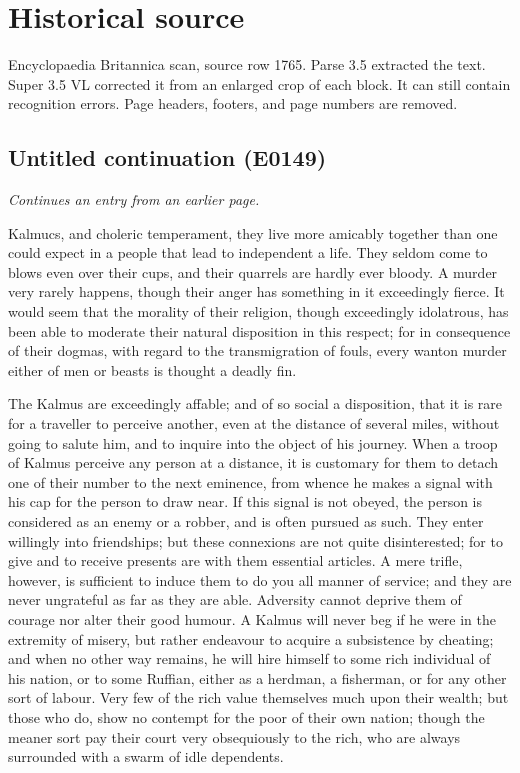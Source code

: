 \documentclass{article}
\begin{document}
\section*{Historical source}
Encyclopaedia Britannica scan, source row 1765. Parse 3.5 extracted the text. Super 3.5 VL corrected it from an enlarged crop of each block. It can still contain recognition errors.
Page headers, footers, and page numbers are removed.

\subsection*{Untitled continuation (E0149)}
\textit{Continues an entry from an earlier page.}

Kalmucs, and choleric temperament, they live more amicably together than one could expect in a people that lead to independent a life. They seldom come to blows even over their cups, and their quarrels are hardly ever bloody. A murder very rarely happens, though their anger has something in it exceedingly fierce. It would seem that the morality of their religion, though exceedingly idolatrous, has been able to moderate their natural disposition in this respect; for in consequence of their dogmas, with regard to the transmigration of fouls, every wanton murder either of men or beasts is thought a deadly fin.

The Kalmus are exceedingly affable; and of so social a disposition, that it is rare for a traveller to perceive another, even at the distance of several miles, without going to salute him, and to inquire into the object of his journey. When a troop of Kalmus perceive any person at a distance, it is customary for them to detach one of their number to the next eminence, from whence he makes a signal with his cap for the person to draw near. If this signal is not obeyed, the person is considered as an enemy or a robber, and is often pursued as such. They enter willingly into friendships; but these connexions are not quite disinterested; for to give and to receive presents are with them essential articles. A mere trifle, however, is sufficient to induce them to do you all manner of service; and they are never ungrateful as far as they are able. Adversity cannot deprive them of courage nor alter their good humour. A Kalmus will never beg if he were in the extremity of misery, but rather endeavour to acquire a subsistence by cheating; and when no other way remains, he will hire himself to some rich individual of his nation, or to some Ruffian, either as a herdman, a fisherman, or for any other sort of labour. Very few of the rich value themselves much upon their wealth; but those who do, show no contempt for the poor of their own nation; though the meaner sort pay their court very obsequiously to the rich, who are always surrounded with a swarm of idle dependents.
\end{document}
